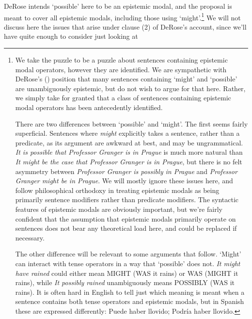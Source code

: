 \documentclass[
  10pt,
  letterpaper,
  DIV=11,
  numbers=noendperiod,
  twoside]{scrartcl}
\begin{document}
DeRose intends `possible' here to be an epistemic modal, and the
proposal is meant to cover all epistemic modals, including those using
`might'.\footnote{We take the puzzle to be a puzzle about sentences
  containing epistemic modal operators, however they are identified. We
  are sympathetic with DeRose's ()
  position that many sentences containing `might' and `possible' are
  unambiguously epistemic, but do not wish to argue for that here.
  Rather, we simply take for granted that a class of sentences
  containing epistemic modal operators has been antecedently identified.

  There are two differences between `possible' and `might'. The first
  seems fairly superficial. Sentences where \emph{might} explicitly
  takes a sentence, rather than a predicate, as its argument are awkward
  at best, and may be ungrammatical. \emph{It is possible that Professor
  Granger is in Prague} is much more natural than \emph{It might be the
  case that Professor Granger is in Prague}, but there is no felt
  asymmetry between \emph{Professor Granger is possibly in Prague} and
  \emph{Professor Granger might be in Prague}. We will mostly ignore
  these issues here, and follow philosophical orthodoxy in treating
  epistemic modals as being primarily sentence modifiers rather than
  predicate modifiers. The syntactic features of epistemic modals are
  obviously important, but we're fairly confident that the assumption
  that epistemic modals primarily operate on sentences does not bear any
  theoretical load here, and could be replaced if necessary.

  The other difference will be relevant to some arguments that follow.
  `Might' can interact with tense operators in a way that `possible'
  does not. \emph{It might have rained} could either mean MIGHT (WAS it
  rains) or WAS (MIGHT it rains), while \emph{It possibly rained}
  unambiguously means POSSIBLY (WAS it rains). It is often hard in
  English to tell just which meaning is meant when a sentence contains
  both tense operators and epistemic modals, but in Spanish these are
  expressed differently: Puede haber llovido; Podría haber llovido.} We
will not discuss here the issues that arise under clause (2) of DeRose's
account, since we'll have quite enough to consider just looking at
\end{document}
